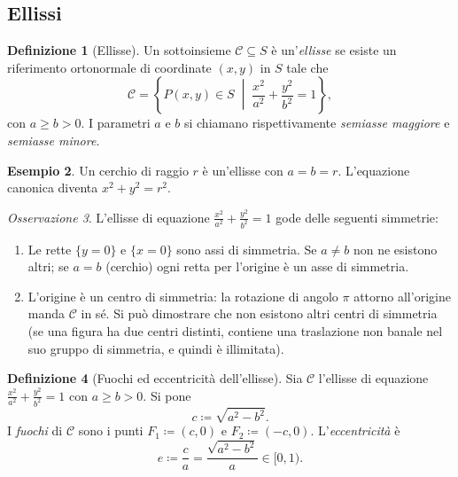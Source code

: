 \documentclass[11pt, a4paper]{book}
\theoremstyle{definition}
\newtheorem{definizione}{Definizione}[section]
\newtheorem{esempio}[definizione]{Esempio}
\theoremstyle{plain}
\theoremstyle{remark}
\newtheorem{osservazione}[definizione]{Osservazione}
\begin{document}
\subsection{Ellissi}

\begin{defbox}
\begin{definizione}[Ellisse]
\label{def:ellisse}
Un sottoinsieme $\mathcal{C} \subseteq S$ è un'\emph{ellisse} se esiste un riferimento ortonormale di coordinate $(x,y)$ in $S$ tale che
\[
  \mathcal{C} = \left\{ P(x,y) \in S \;\middle|\; \frac{x^2}{a^2} + \frac{y^2}{b^2} = 1 \right\},
\]
con $a \geq b > 0$. I parametri $a$ e $b$ si chiamano rispettivamente \emph{semiasse maggiore} e \emph{semiasse minore}.
\end{definizione}
\end{defbox}

\begin{esempio}
Un cerchio di raggio $r$ è un'ellisse con $a = b = r$. L'equazione canonica diventa $x^2 + y^2 = r^2$.
\end{esempio}

\begin{osservazione}
\label{oss:simmetrie-ellisse}
L'ellisse di equazione $\frac{x^2}{a^2} + \frac{y^2}{b^2} = 1$ gode delle seguenti simmetrie:
\begin{enumerate}[label=(\arabic*)]
  \item Le rette $\{y=0\}$ e $\{x=0\}$ sono assi di simmetria. Se $a \neq b$ non ne esistono altri; se $a = b$ (cerchio) ogni retta per l'origine è un asse di simmetria.
  \item L'origine è un centro di simmetria: la rotazione di angolo $\pi$ attorno all'origine manda $\mathcal{C}$ in sé. Si può dimostrare che non esistono altri centri di simmetria (se una figura ha due centri distinti, contiene una traslazione non banale nel suo gruppo di simmetria, e quindi è illimitata).
\end{enumerate}
\end{osservazione}

\begin{defbox}
\begin{definizione}[Fuochi ed eccentricità dell'ellisse]
\label{def:fuochi-ellisse}
Sia $\mathcal{C}$ l'ellisse di equazione $\frac{x^2}{a^2}+\frac{y^2}{b^2}=1$ con $a \geq b > 0$. Si pone
\[
  c \coloneqq \sqrt{a^2 - b^2}.
\]
I \emph{fuochi} di $\mathcal{C}$ sono i punti $F_1 \coloneqq (c,0)$ e $F_2 \coloneqq (-c,0)$. L'\emph{eccentricità} è
\[
  e \coloneqq \frac{c}{a} = \frac{\sqrt{a^2-b^2}}{a} \in [0,1).
\]
\end{definizione}
\end{defbox}
\end{document}
